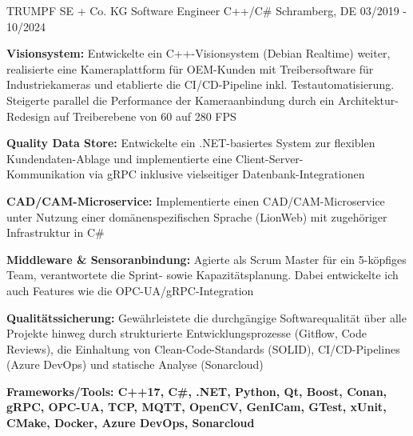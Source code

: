 \cventry
{TRUMPF SE + Co. KG} %
{Software Engineer C++/C\#} %
{Schramberg, DE} %
{03/2019 - 10/2024} %
\begin{cvitems}
\item \textbf{Visionsystem:} Entwickelte ein C++-Visionsystem (Debian Realtime)  weiter, realisierte eine Kameraplattform für OEM-Kunden mit Treibersoftware für Industriekameras und etablierte die CI/CD-Pipeline inkl. Testautomatisierung. Steigerte parallel die Performance der Kameraanbindung durch ein Architektur-Redesign auf Treiberebene von 60 auf 280 FPS
\item \textbf{Quality Data Store:} Entwickelte ein .NET-basiertes System zur flexiblen Kundendaten-Ablage  und implementierte eine Client-Server-\\ Kommunikation via gRPC inklusive vielseitiger Datenbank-Integrationen
\item \textbf{CAD/CAM-Microservice:} Implementierte einen CAD/CAM-Microservice unter Nutzung einer domänenspezifischen Sprache (LionWeb) mit zugehöriger Infrastruktur in C\#
\item \textbf{Middleware \& Sensoranbindung:} Agierte als Scrum Master für ein 5-köpfiges Team, verantwortete die Sprint- sowie Kapazitätsplanung. Dabei entwickelte ich auch Features wie die OPC-UA/gRPC-Integration
\item \textbf{Qualitätssicherung:} Gewährleistete die durchgängige Softwarequalität über alle Projekte hinweg durch strukturierte Entwicklungsprozesse (Gitflow, Code Reviews), die Einhaltung von Clean-Code-Standards (SOLID), CI/CD-Pipelines (Azure DevOps) und statische Analyse (Sonarcloud)
\item[] \textbf{Frameworks/Tools: C++17, C\#, .NET, Python, Qt, Boost, Conan, gRPC, OPC-UA, TCP, MQTT, OpenCV, GenICam, GTest, xUnit, CMake, Docker, Azure DevOps, Sonarcloud}
\end{cvitems}
